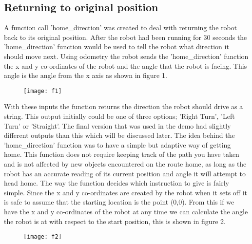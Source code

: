 \documentclass[]{article}
\begin{document}
\subsection{Returning to original position}
A function call 'home\_direction' was created to deal with returning the robot back to its original position. After the robot had been running for 30 seconds the 'home\_direction' function would be used to tell the robot what direction it should move next. Using odometry the robot sends the 'home\_direction' function the x and y co-ordinates of the robot and the angle that the robot is facing. This angle is the angle from the x axis as shown in figure 1.\\
\begin{figure}
 \centering
 \texttt{[image: f1]}
 \caption{}
\end{figure}
With these inputs the function returns the direction the robot should drive as a string. This output initially could be one of three options; 'Right Turn', 'Left Turn' or 'Straight'. The final version that was used in the demo had slightly different outputs than this which will be discussed later. The idea behind the 'home\_direction' function was to have a simple but adaptive way of getting home. This function does not require keeping track of the path you have taken and is not affected by new objects encountered on the route home, as long as the robot has an accurate reading of its current position and angle it will attempt to head home. The way the function decides which instruction to give is fairly simple. Since the x and y co-ordinates are created by the robot when it sets off it is safe to assume that the starting location is the point (0,0). From this if we have the x and y co-ordinates of the robot at any time we can calculate the angle the robot is at with respect to the start position, this is shown in figure 2. \\
\begin{figure}
 \centering
 \texttt{[image: f2]}
 \caption{}
\end{figure}
\end{document}
